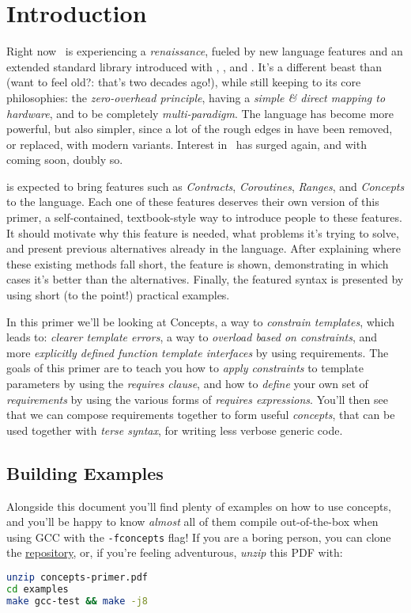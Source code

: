 \section{Introduction} \label{sec:introduction}

Right now \Cpp\ is experiencing a \emph{renaissance}, fueled by new language features and an extended standard library introduced with , , and . It's a different beast than  (want to feel old?: that's two decades ago!), while still keeping to its core philosophies: the \emph{zero-overhead principle}, having a \emph{simple \& direct mapping to hardware}, and to be completely \emph{multi-paradigm}. The language has become more powerful, but also simpler, since a lot of the rough edges in  have been removed, or replaced, with modern variants. Interest in \Cpp\ has surged again, and with  coming soon\texttrademark, doubly so.

 is expected to bring features such as \emph{Contracts}, \emph{Coroutines}, \emph{Ranges}, and \emph{Concepts} to the language. Each one of these features deserves their own version of this primer, a self-contained, textbook-style way to introduce people to these features. It should motivate why this feature is needed, what problems it's trying to solve, and present previous alternatives already in the language. After explaining where these existing methods fall short, the feature is shown, demonstrating in which cases it's better than the alternatives. Finally, the featured syntax is presented by using short (to the point!) practical examples.

In this primer we'll be looking at Concepts, a way to \emph{constrain templates}, which leads to: \emph{clearer template errors}, a way to \emph{overload based on constraints}, and more \emph{explicitly defined function template interfaces} by using requirements. The goals of this primer are to teach you how to \emph{apply constraints} to template parameters by using the \emph{requires clause}, and how to \emph{define} your own set of \emph{requirements} by using the various forms of \emph{requires expressions}. You'll then see that we can compose requirements together to form useful \emph{concepts}, that can be used together with \emph{terse syntax}, for writing less verbose generic code.

\subsection*{Building Examples}

Alongside this document you'll find plenty of examples on how to use concepts, and you'll be happy to know \emph{almost} all of them compile out-of-the-box when using GCC with the \texttt{-fconcepts} flag! If you are a boring person, you can clone the \href{https://github.com/CaffeineViking/concepts-primer}{repository}, or, if you're feeling adventurous, \emph{unzip} this PDF with:

\begin{lstlisting}[language=bash, morekeywords={unzip, make},
                                  deletekeywords={test}]
unzip concepts-primer.pdf
cd examples
make gcc-test && make -j8
\end{lstlisting}
